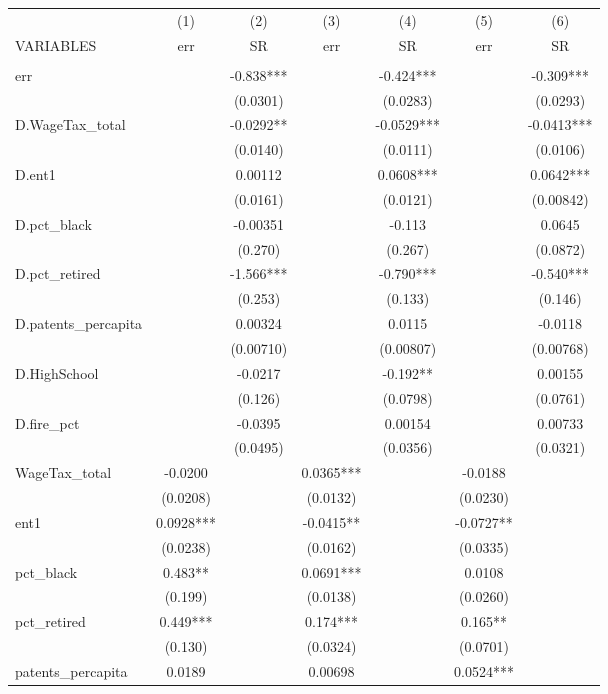 \begin{tabular}{lcccccc} \hline
 & (1) & (2) & (3) & (4) & (5) & (6) \\
VARIABLES & err & SR & err & SR & err & SR \\ \hline
 &  &  &  &  &  &  \\
err &  & -0.838*** &  & -0.424*** &  & -0.309*** \\
 &  & (0.0301) &  & (0.0283) &  & (0.0293) \\
D.WageTax\_total &  & -0.0292** &  & -0.0529*** &  & -0.0413*** \\
 &  & (0.0140) &  & (0.0111) &  & (0.0106) \\
D.ent1 &  & 0.00112 &  & 0.0608*** &  & 0.0642*** \\
 &  & (0.0161) &  & (0.0121) &  & (0.00842) \\
D.pct\_black &  & -0.00351 &  & -0.113 &  & 0.0645 \\
 &  & (0.270) &  & (0.267) &  & (0.0872) \\
D.pct\_retired &  & -1.566*** &  & -0.790*** &  & -0.540*** \\
 &  & (0.253) &  & (0.133) &  & (0.146) \\
D.patents\_percapita &  & 0.00324 &  & 0.0115 &  & -0.0118 \\
 &  & (0.00710) &  & (0.00807) &  & (0.00768) \\
D.HighSchool &  & -0.0217 &  & -0.192** &  & 0.00155 \\
 &  & (0.126) &  & (0.0798) &  & (0.0761) \\
D.fire\_pct &  & -0.0395 &  & 0.00154 &  & 0.00733 \\
 &  & (0.0495) &  & (0.0356) &  & (0.0321) \\
WageTax\_total & -0.0200 &  & 0.0365*** &  & -0.0188 &  \\
 & (0.0208) &  & (0.0132) &  & (0.0230) &  \\
ent1 & 0.0928*** &  & -0.0415** &  & -0.0727** &  \\
 & (0.0238) &  & (0.0162) &  & (0.0335) &  \\
pct\_black & 0.483** &  & 0.0691*** &  & 0.0108 &  \\
 & (0.199) &  & (0.0138) &  & (0.0260) &  \\
pct\_retired & 0.449*** &  & 0.174*** &  & 0.165** &  \\
 & (0.130) &  & (0.0324) &  & (0.0701) &  \\
patents\_percapita & 0.0189 &  & 0.00698 &  & 0.0524*** &  \\

\end{tabular}
